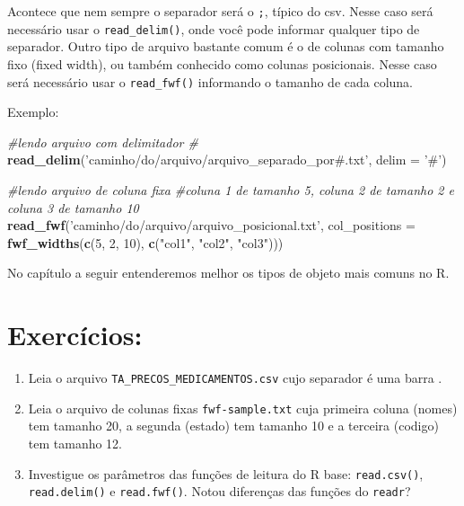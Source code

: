 \documentclass[]{book}
\newenvironment{Shaded}{\begin{snugshade}}{\end{snugshade}}
\newcommand{\KeywordTok}[1]{\textcolor[rgb]{0.13,0.29,0.53}{\textbf{#1}}}
\newcommand{\DataTypeTok}[1]{\textcolor[rgb]{0.13,0.29,0.53}{#1}}
\newcommand{\DecValTok}[1]{\textcolor[rgb]{0.00,0.00,0.81}{#1}}
\newcommand{\StringTok}[1]{\textcolor[rgb]{0.31,0.60,0.02}{#1}}
\newcommand{\CommentTok}[1]{\textcolor[rgb]{0.56,0.35,0.01}{\textit{#1}}}
\newcommand{\NormalTok}[1]{#1}
\begin{document}
Acontece que nem sempre o separador será o \texttt{;}, típico do csv.
Nesse caso será necessário usar o \texttt{read\_delim()}, onde você pode
informar qualquer tipo de separador. Outro tipo de arquivo bastante
comum é o de colunas com tamanho fixo (fixed width), ou também conhecido
como colunas posicionais. Nesse caso será necessário usar o
\texttt{read\_fwf()} informando o tamanho de cada coluna.

Exemplo:

\begin{Shaded}
\begin{Highlighting}[]
\CommentTok{#lendo arquivo com delimitador #}
\KeywordTok{read_delim}\NormalTok{(}\StringTok{'caminho/do/arquivo/arquivo_separado_por#.txt'}\NormalTok{, }\DataTypeTok{delim =} \StringTok{'#'}\NormalTok{)}

\CommentTok{#lendo arquivo de coluna fixa}
\CommentTok{#coluna 1 de tamanho 5, coluna 2 de tamanho 2 e coluna 3 de tamanho 10}
\KeywordTok{read_fwf}\NormalTok{(}\StringTok{'caminho/do/arquivo/arquivo_posicional.txt'}\NormalTok{, }\DataTypeTok{col_positions =} \KeywordTok{fwf_widths}\NormalTok{(}\KeywordTok{c}\NormalTok{(}\DecValTok{5}\NormalTok{, }\DecValTok{2}\NormalTok{, }\DecValTok{10}\NormalTok{), }\KeywordTok{c}\NormalTok{(}\StringTok{"col1"}\NormalTok{, }\StringTok{"col2"}\NormalTok{, }\StringTok{"col3"}\NormalTok{)))}
\end{Highlighting}
\end{Shaded}

No capítulo a seguir entenderemos melhor os tipos de objeto mais comuns
no R.

\section{Exercícios:}\label{exercicios-2}

\begin{enumerate}
\def\labelenumi{\arabic{enumi}.}
\item
  Leia o arquivo \texttt{TA\_PRECOS\_MEDICAMENTOS.csv} cujo separador é
  uma barra \texttt{\textbar{}}.
\item
  Leia o arquivo de colunas fixas \texttt{fwf-sample.txt} cuja primeira
  coluna (nomes) tem tamanho 20, a segunda (estado) tem tamanho 10 e a
  terceira (codigo) tem tamanho 12.
\item
  Investigue os parâmetros das funções de leitura do R base:
  \texttt{read.csv()}, \texttt{read.delim()} e \texttt{read.fwf()}.
  Notou diferenças das funções do \texttt{readr}?
\end{enumerate}
\end{document}
